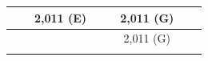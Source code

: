 \documentclass[svgnames,11pt]{beamer}
\begin{document}
\begin{frame}
\begin{center}
{\begin{tabular}{|*{8}{c|}}
            \hline
            \cellcolor{gray} & \cellcolor{gray}    & 2,011 (E)     &\cellcolor{gray}     & \cellcolor{gray}   & 2,011 (G)     & \cellcolor{gray}        \\
            \hline
            \cellcolor{gray} & \cellcolor{gray}    & \cellcolor{gray}    &\cellcolor{gray}     & \cellcolor{gray}   & 2,011 (G)     & \cellcolor{gray}        \\
            \hline
            \cellcolor{gray} & \cellcolor{gray}    & \cellcolor{gray}    &\cellcolor{gray}     & \cellcolor{gray}   & \cellcolor{gray}     & \cellcolor{gray}        \\
            \hline
        \end{tabular}
        }
    \end{center}
\end{frame}
\end{document}
